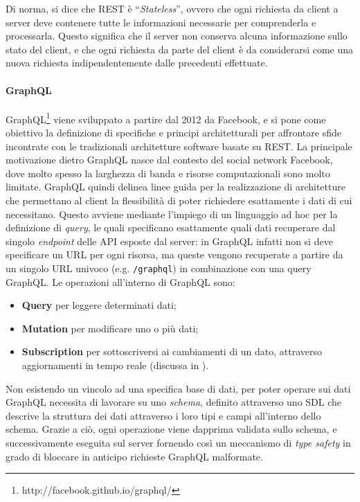 Di norma, si dice che \ac{REST} è ``\textit{Stateless}'', ovvero che ogni richiesta da client a server deve contenere tutte le informazioni necessarie
per comprenderla e processarla. Questo significa che il server non conserva alcuna informazione sullo stato del client, e che ogni richiesta da parte
del client è da considerarsi come una nuova richiesta indipendentemente dalle precedenti effettuate.

\paragraph{GraphQL}\label{par:gql}
GraphQL\footnote{http://facebook.github.io/graphql/} viene sviluppato a partire dal 2012 da Facebook, e si pone come obiettivo la definizione di specifiche e principi architetturali
per affrontare sfide incontrate con le tradizionali architetture software basate su \ac{REST}. La principale motivazione dietro GraphQL nasce dal
contesto del social network Facebook, dove molto spesso la larghezza di banda e risorse computazionali sono molto limitate. GraphQL quindi delinea
linee guida per la realizzazione di architetture che permettano al client la flessibilità di poter richiedere esattamente i dati di cui necessitano.
Questo avviene mediante l'impiego di un linguaggio ad hoc per la definizione di \textit{query}, le quali specificano esattamente quali dati recuperare
dal singolo \textit{endpoint} delle API esposte dal server: in GraphQL infatti non si deve specificare un URL per ogni risorsa, ma queste vengono 
recuperate a partire da un singolo URL univoco (e.g. \texttt{/graphql}) in combinazione con una query GraphQL.
Le operazioni all'interno di GraphQL sono:
\begin{itemize}
    \item \textbf{Query} per leggere determinati dati;
    \item \textbf{Mutation} per modificare uno o più dati;
    \item \textbf{Subscription} per sottoscriversi ai cambiamenti di un dato, attraverso aggiornamenti in tempo reale (discussa in ).
\end{itemize}
Non esistendo un vincolo ad una specifica base di dati, per poter operare sui dati GraphQL necessita di lavorare su uno \textit{schema}, definito
attraverso uno \ac{SDL} che descrive la struttura dei dati attraverso i loro tipi e campi all'interno dello schema. Grazie a ciò, ogni operazione
viene dapprima validata sullo schema, e successivamente eseguita sul server fornendo così un meccanismo di \textit{type safety} in grado di bloccare
in anticipo richieste GraphQL malformate.

